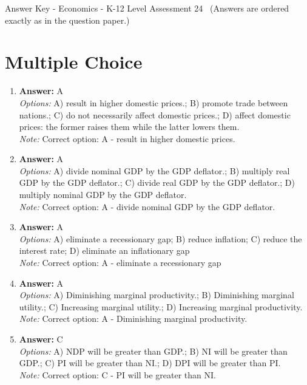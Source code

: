 \documentclass[12pt]{article}
\begin{document}
\begin{center}
Answer Key - Economics - K-12 Level Assessment 24 \
\small (Answers are ordered exactly as in the question paper.)
\end{center}

\section*{Multiple Choice}
\begin{enumerate}[label=\arabic*.]
\item \textbf{Answer:} A
\\ \textit{Options:} A) result in higher domestic prices.; B) promote trade between nations.; C) do not necessarily affect domestic prices.; D) affect domestic prices: the former raises them while the latter lowers them.
\\ \textit{Note:} Correct option: A - result in higher domestic prices.
\item \textbf{Answer:} A
\\ \textit{Options:} A) divide nominal GDP by the GDP deflator.; B) multiply real GDP by the GDP deflator.; C) divide real GDP by the GDP deflator.; D) multiply nominal GDP by the GDP deflator.
\\ \textit{Note:} Correct option: A - divide nominal GDP by the GDP deflator.
\item \textbf{Answer:} A
\\ \textit{Options:} A) eliminate a recessionary gap; B) reduce inflation; C) reduce the interest rate; D) eliminate an inflationary gap
\\ \textit{Note:} Correct option: A - eliminate a recessionary gap
\item \textbf{Answer:} A
\\ \textit{Options:} A) Diminishing marginal productivity.; B) Diminishing marginal utility.; C) Increasing marginal utility.; D) Increasing marginal productivity.
\\ \textit{Note:} Correct option: A - Diminishing marginal productivity.
\item \textbf{Answer:} C
\\ \textit{Options:} A) NDP will be greater than GDP.; B) NI will be greater than GDP.; C) PI will be greater than NI.; D) DPI will be greater than PI.
\\ \textit{Note:} Correct option: C - PI will be greater than NI.
\end{enumerate}
\end{document}
